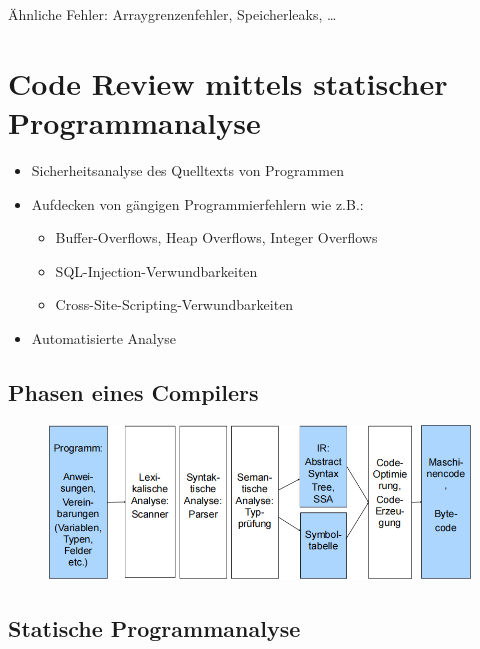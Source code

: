 \documentclass[openany]{book}
\begin{document}
Ähnliche Fehler: Arraygrenzenfehler, Speicherleaks, \dots

\newpage

\section{Code Review mittels statischer Programmanalyse}

\begin{itemize}
    \item Sicherheitsanalyse des Quelltexts von Programmen
    \item Aufdecken von gängigen Programmierfehlern wie z.B.:
    \begin{itemize}
        \item Buffer-Overflows, Heap Overflows, Integer Overflows
        \item SQL-Injection-Verwundbarkeiten
        \item Cross-Site-Scripting-Verwundbarkeiten
    \end{itemize}
    \item Automatisierte Analyse
\end{itemize}

\subsection{Phasen eines Compilers}

\begin{figure}[h!]
    \centering
    \includegraphics[width=\linewidth]{Pics/Compiler.PNG}
\end{figure}

\subsection{Statische Programmanalyse}
\end{document}
